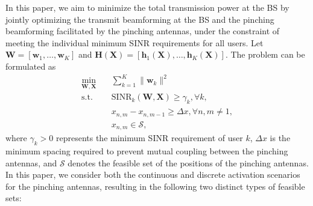 In this paper, we aim to minimize the total transmission power at the BS by jointly optimizing the transmit beamforming at the BS and the pinching beamforming facilitated by the pinching antennas, under the constraint of meeting the individual minimum SINR requirements for all users. Let $\mathbf{W} = [\mathbf{w}_1,\dots,\mathbf{w}_K]$ and $\mathbf{H}(\mathbf{X}) = [\mathbf{h}_1(\mathbf{X}),\dots,\mathbf{h}_K(\mathbf{X})]$. The problem can be formulated as
\begin{subequations} \label{hybrid_beamforming_problem}
    \begin{align}
        \min_{\mathbf{W}, \mathbf{X}} \quad & \sum_{k=1}^K \|\mathbf{w}_k\|^2 \\
        \mathrm{s.t.} \quad & \mathrm{SINR}_k(\mathbf{W}, \mathbf{X}) \ge \gamma_k, \forall k, \\
        \label{theta_constraint_1}
        & x_{n,m} - x_{n,m-1} \ge \Delta x, \forall n, m\neq 1, \\
        \label{theta_constraint_2}
        & x_{n,m} \in \mathcal{S},
    \end{align}
\end{subequations}
where $\gamma_k > 0$ represents the minimum SINR requirement of user $k$, $\Delta x$ is the minimum spacing required to prevent mutual coupling between the pinching antennas, and $\mathcal{S}$ denotes the feasible set of the positions of the pinching antennas. In this paper, we consider both the continuous and discrete activation scenarios for the pinching antennas, resulting in the following two distinct types of feasible sets:
